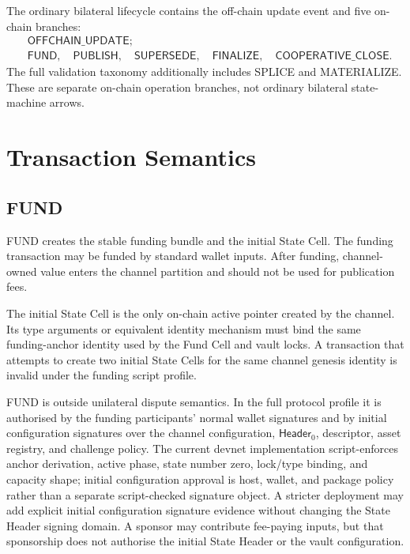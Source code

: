 \documentclass[a4paper,11pt]{article}
\newcommand{\Header}{\mathsf{Header}}
\begin{document}
The ordinary bilateral lifecycle contains the off-chain update event and five
on-chain branches:
\[
\begin{aligned}
&\mathsf{OFFCHAIN\_UPDATE};\\
&\mathsf{FUND},\quad
\mathsf{PUBLISH},\quad
\mathsf{SUPERSEDE},\quad
\mathsf{FINALIZE},\quad
\mathsf{COOPERATIVE\_CLOSE}.
\end{aligned}
\]
The full validation taxonomy additionally includes \textsf{SPLICE} and
\textsf{MATERIALIZE}. These are separate on-chain operation branches, not
ordinary bilateral state-machine arrows.

\clearpage
\section{Transaction Semantics}

\subsection{FUND}

\textsf{FUND} creates the stable funding bundle and the initial State Cell. The funding transaction may be funded by standard wallet inputs. After funding, channel-owned value enters the channel partition and should not be used for publication fees.

The initial State Cell is the only on-chain active pointer created by the channel. Its type arguments or equivalent identity mechanism must bind the same funding-anchor identity used by the Fund Cell and vault locks. A transaction that attempts to create two initial State Cells for the same channel genesis identity is invalid under the funding script profile.

\textsf{FUND} is outside unilateral dispute semantics. In the full protocol
profile it is authorised by the funding participants' normal wallet signatures
and by initial configuration signatures over the channel configuration,
\(\Header_0\), descriptor, asset registry, and challenge policy. The current
devnet implementation script-enforces anchor derivation, active phase, state
number zero, lock/type binding, and capacity shape; initial configuration
approval is host, wallet, and package policy rather than a separate
script-checked signature object. A stricter deployment may add explicit initial
configuration signature evidence without changing the State Header signing
domain. A sponsor may contribute fee-paying inputs, but that sponsorship does
not authorise the initial State Header or the vault configuration.
\end{document}
